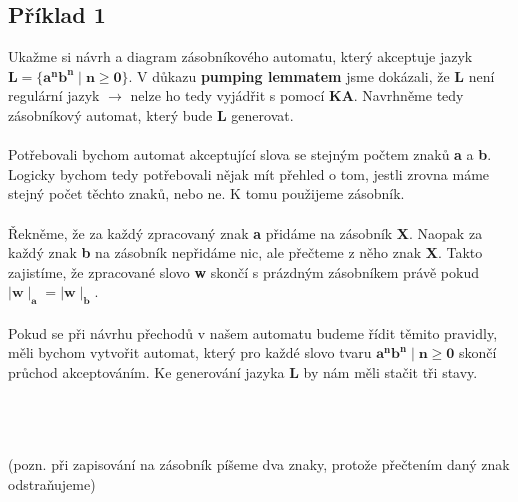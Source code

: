 \documentclass{report}
\begin{document}
\subsection*{Příklad 1}
Ukažme si návrh a diagram zásobníkového automatu, který akceptuje jazyk $\mathbf{L = \{a^nb^n \mid n \ge 0\}}$. V důkazu \textbf{pumping lemmatem} jsme dokázali, že \textbf{L} není regulární jazyk $\rightarrow$ nelze ho tedy vyjádřit s pomocí \textbf{KA}. Navrhněme tedy zásobníkový automat, který bude \textbf{L} generovat.\\ \\
Potřebovali bychom automat akceptující slova se stejným počtem znaků \textbf{a} a \textbf{b}. Logicky bychom tedy potřebovali nějak mít přehled o tom, jestli zrovna máme stejný počet těchto znaků, nebo ne. K tomu použijeme zásobník.\\ \\ Řekněme, že za každý zpracovaný znak \textbf{a} přidáme na zásobník \textbf{X}. Naopak za každý znak \textbf{b} na zásobník nepřidáme nic, ale přečteme z něho znak \textbf{X}. Takto zajistíme, že zpracované slovo \textbf{w} skončí s prázdným zásobníkem právě pokud $\mathbf{\mid{w}\mid_a{=}\mid{w}\mid_b}$.\\ \\
Pokud se při návrhu přechodů v našem automatu budeme řídit těmito pravidly, měli bychom vytvořit automat, který pro každé slovo tvaru $\mathbf{a^nb^n \mid n \ge 0}$ skončí průchod akceptováním. Ke generování jazyka \textbf{L} by nám měli stačit tři stavy.\\ \\
\begin{center}
\end{center}
\\ \\(pozn. při zapisování na zásobník píšeme dva znaky, protože přečtením daný znak odstraňujeme)\\ \\
\end{document}
